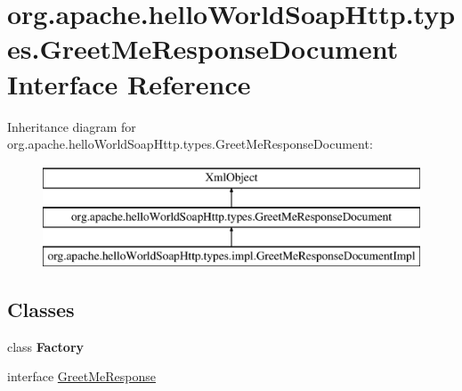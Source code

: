 \hypertarget{interfaceorg_1_1apache_1_1hello_world_soap_http_1_1types_1_1_greet_me_response_document}{}\section{org.\+apache.\+hello\+World\+Soap\+Http.\+types.\+Greet\+Me\+Response\+Document Interface Reference}
\label{interfaceorg_1_1apache_1_1hello_world_soap_http_1_1types_1_1_greet_me_response_document}
Inheritance diagram for org.\+apache.\+hello\+World\+Soap\+Http.\+types.\+Greet\+Me\+Response\+Document\+:\begin{figure}[H]
\begin{center}
\leavevmode
\includegraphics[height=3.000000cm]{interfaceorg_1_1apache_1_1hello_world_soap_http_1_1types_1_1_greet_me_response_document}
\end{center}
\end{figure}
\subsection*{Classes}
\begin{DoxyCompactItemize}
\item 
class {\bfseries Factory}
\item 
interface \hyperlink{interfaceorg_1_1apache_1_1hello_world_soap_http_1_1types_1_1_greet_me_response_document_1_1_greet_me_response}{Greet\+Me\+Response}
\end{DoxyCompactItemize}
